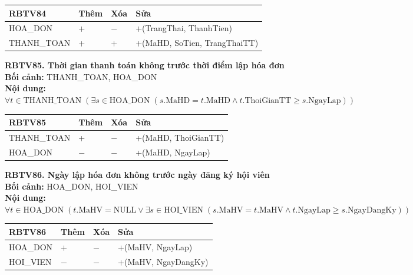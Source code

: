 \documentclass[11pt, a4paper]{article}
\begin{document}
\vspace{0.3em}
\begin{small}
\begin{tabularx}{\textwidth}{| C{4.2cm} | C{2cm} | C{2cm} | Y |}
\hline
\textbf{RBTV84} & \textbf{Thêm} & \textbf{Xóa} & \textbf{Sửa} \\
\hline
HOA\_DON & + & $-$ & +(TrangThai, ThanhTien) \\
\hline
THANH\_TOAN & + & + & +(MaHD, SoTien, TrangThaiTT) \\
\hline
\end{tabularx}
\end{small}

\vspace{0.8em}
\textbf{RBTV85. Thời gian thanh toán không trước thời điểm lập hóa đơn} \\
\textbf{Bối cảnh:} THANH\_TOAN, HOA\_DON \\
\textbf{Nội dung:} $\forall t \in \text{THANH\_TOAN} \; (\exists s \in \text{HOA\_DON} \; (s.\text{MaHD} = t.\text{MaHD} \land t.\text{ThoiGianTT} \ge s.\text{NgayLap}))$

\vspace{0.3em}
\begin{small}
\begin{tabularx}{\textwidth}{| C{4.2cm} | C{2cm} | C{2cm} | Y |}
\hline
\textbf{RBTV85} & \textbf{Thêm} & \textbf{Xóa} & \textbf{Sửa} \\
\hline
THANH\_TOAN & + & $-$ & +(MaHD, ThoiGianTT) \\
\hline
HOA\_DON & $-$ & $-$ & +(MaHD, NgayLap) \\
\hline
\end{tabularx}
\end{small}

\vspace{0.8em}
\textbf{RBTV86. Ngày lập hóa đơn không trước ngày đăng ký hội viên} \\
\textbf{Bối cảnh:} HOA\_DON, HOI\_VIEN \\
\textbf{Nội dung:} $\forall t \in \text{HOA\_DON} \; (t.\text{MaHV} = \text{NULL} \lor \exists s \in \text{HOI\_VIEN} \; (s.\text{MaHV} = t.\text{MaHV} \land t.\text{NgayLap} \ge s.\text{NgayDangKy}))$

\vspace{0.3em}
\begin{small}
\begin{tabularx}{\textwidth}{| C{4.2cm} | C{2cm} | C{2cm} | Y |}
\hline
\textbf{RBTV86} & \textbf{Thêm} & \textbf{Xóa} & \textbf{Sửa} \\
\hline
HOA\_DON & + & $-$ & +(MaHV, NgayLap) \\
\hline
HOI\_VIEN & $-$ & $-$ & +(MaHV, NgayDangKy) \\
\hline
\end{tabularx}
\end{small}
\end{document}
